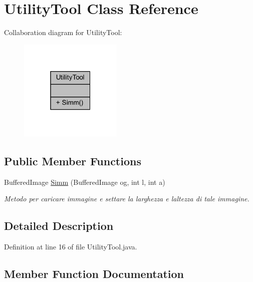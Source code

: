 \hypertarget{classa_1_1survival_1_1game_1_1_utility_tool}{}\section{Utility\+Tool Class Reference}
\label{classa_1_1survival_1_1game_1_1_utility_tool}


Collaboration diagram for Utility\+Tool\+:
\nopagebreak
\begin{figure}[H]
\begin{center}
\leavevmode
\includegraphics[width=139pt]{classa_1_1survival_1_1game_1_1_utility_tool__coll__graph}
\end{center}
\end{figure}
\subsection*{Public Member Functions}
\begin{DoxyCompactItemize}
\item 
Buffered\+Image \hyperlink{classa_1_1survival_1_1game_1_1_utility_tool_abff420c853a4516e9cbeff28352e6303}{Simm} (Buffered\+Image og, int l, int a)
\begin{DoxyCompactList}\small\item\em Metodo per caricare immagine e settare la larghezza e l\textquotesingle{}altezza di tale immagine. \end{DoxyCompactList}\end{DoxyCompactItemize}


\subsection{Detailed Description}


Definition at line 16 of file Utility\+Tool.\+java.



\subsection{Member Function Documentation}
\mbox{\label{classa_1_1survival_1_1game_1_1_utility_tool_abff420c853a4516e9cbeff28352e6303}} 
